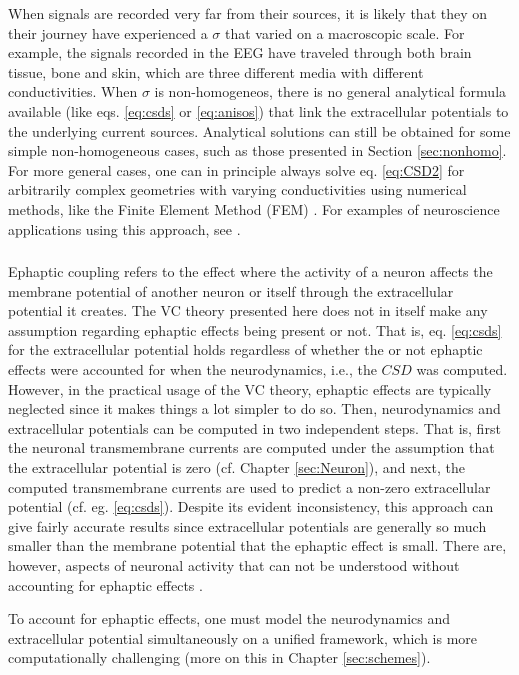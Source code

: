 When signals are recorded very far from their sources, it is likely that they on their journey have experienced a $\sigma$ that varied on a macroscopic scale. For example, the signals recorded in the EEG have traveled through both brain tissue, bone and skin, which are three different media with different conductivities. When $\sigma$ is non-homogeneos, there is no general analytical formula available (like eqs. \ref{eq:csds} or \ref{eq:anisos}) that link the extracellular potentials to the underlying current sources. Analytical solutions can still be obtained for some simple non-homogeneous cases, such as those presented in Section \ref{sec:nonhomo}. For more general cases, one can in principle always solve eq. \ref{eq:CSD2} for arbitrarily complex geometries with varying conductivities using numerical methods, like the Finite Element Method (FEM) \citep{Logg2012}. For examples of neuroscience applications using this approach, see \cite{Moffitt2005, Frey2009, Joucla2012, Haufe2015, Ness2015, Buccino2019b, Obien2019}. 





\subsubsection{ }
Ephaptic coupling refers to the effect where the activity of a neuron affects the membrane potential of another neuron or itself through the extracellular potential it creates. The VC theory presented here does not in itself make any assumption regarding ephaptic effects being present or not. That is, eq. \ref{eq:csds} for the extracellular potential holds regardless of whether the or not ephaptic effects were accounted for when the neurodynamics, i.e., the $CSD$ was computed. However, in the practical usage of the VC theory, ephaptic effects are typically neglected since it makes things a lot simpler to do so. Then, neurodynamics and extracellular potentials can be computed in two independent steps. That is, first the neuronal transmembrane currents are computed under the assumption that the extracellular potential is zero (cf. Chapter \ref{sec:Neuron}), and next, the computed transmembrane currents are used to predict a non-zero extracellular potential (cf. eg. \ref{eq:csds}). Despite its evident inconsistency, this approach can give fairly accurate results since extracellular potentials are generally so much smaller than the membrane potential that the ephaptic effect is small. There are, however, aspects of neuronal activity that can not be understood without accounting for ephaptic effects \cite{Holt1999, Anastassiou2015, Goldwyn2016}. 

To account for ephaptic effects, one must model the neurodynamics and extracellular potential simultaneously on a unified framework, which is more computationally challenging (more on this in Chapter \ref{sec:schemes}).



